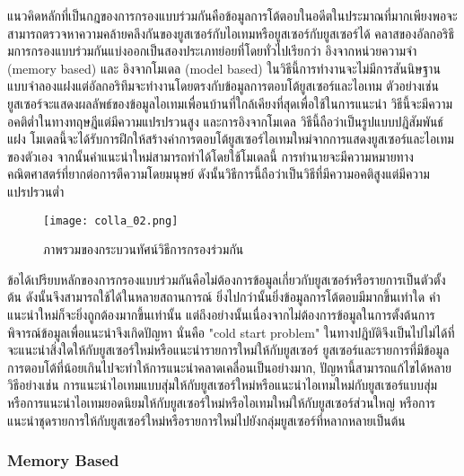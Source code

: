 แนวคิดหลักที่เป็นกฎของการกรองแบบร่วมกันคือข้อมูลการโต้ตอบในอดีตในประมาณที่มากเพียงพอจะสามารถตรวจหาความคล้ายคลึงกันของยูสเซอร์กับไอเทมหรือยูสเซอร์กับยูสเซอร์ได้ 
คลาสของอัลกอริธึมการกรองแบบร่วมกันแบ่งออกเป็นสองประเภทย่อยที่โดยทั่วไปเรียกว่า อิงจากหน่วยความจำ (memory based) และ อิงจากโมเดล (model based) ในวิธีนี้การทำงานจะไม่มีการสันนิษฐานแบบจำลองแฝงแต่อัลกอริทึมจะทำงานโดยตรงกับข้อมูลการตอบโต้ยูสเซอร์และไอเทม ตัวอย่างเช่น ยูสเซอร์จะแสดงผลลัพธ์ของข้อมูลไอเทมเพื่อนบ้านที่ใกล้เคียงที่สุดเพื่อใช้ในการแนะนำ วิธีนี้จะมีความอคติต่ำในทางทฤษฎีแต่มีความแปรปรวนสูง 
และการอิงจากโมเดล วิธีนี้ถือว่าเป็นรูปแบบปฎิสัมพันธ์แฝง โมเดลนี้จะได้รับการฝึกให้สร้างค่าการตอบโต้ยูสเซอร์ไอเทมใหม่จากการแสดงยูสเซอร์และไอเทมของตัวเอง จากนั้นคำแนะนำใหม่สามารถทำได้โดยใช้โมเดลนี้ การทำนายจะมีความหมายทางคณิตศาสตร์ที่ยากต่อการตีความโดยมนุษย์ ดังนั้นวิธีการนี้ถือว่าเป็นวิธีที่มีความอคติสูงแต่มีความแปรปรวนต่ำ
\newline
\begin{figure}[!h]
  \centering
  \texttt{[image: colla\_02.png]}  
  \caption{ภาพรวมของกระบวนทัศน์วิธีการกรองร่วมกัน}
  \label{Fig:cell-and-block}
\end{figure}
\pagebreak

ข้อได้เปรียบหลักของการกรองแบบร่วมกันคือไม่ต้องการข้อมูลเกี่ยวกับยูสเซอร์หรือรายการเป็นตัวตั้งต้น ดังนั้นจึงสามารถใช้ได้ในหลายสถานการณ์ ยิ่งไปกว่านั้นยิ่งข้อมูลการโต้ตอบมีมากขึ้นเท่าใด คำแนะนำใหม่ก็จะยิ่งถูกต้องมากขึ้นเท่านั้น
แต่ถึงอย่างนั้นเนื่องจากไม่ต้องการข้อมูลในการตั้งต้นการพิจารณ์ข้อมูลเพื่อแนะนำจึงเกิดปัญหา นั่นคือ "cold start problem" ในทางปฎิบัติจึงเป็นไปไม่ได้ที่จะแนะนำสิ่งใดให้กับยูสเซอร์ใหม่หรือแนะนำรายการใหม่ให้กับยูสเซอร์ ยูสเซอร์และรายการที่มีข้อมูลการตอบโต้ที่น้อยเกินไปจะทำให้การแนะนำคลาดเคลื่อนเป็นอย่างมาก, ปัญหานี้สามารถแก้ไขได้หลายวิธีอย่างเช่น การแนะนำไอเทมแบบสุ่มให้กับยูสเซอร์ใหม่หรือแนะนำไอเทมใหม่กับยูสเซอร์แบบสุ่ม หรือการแนะนำไอเทมยอดนิยมให้กับยูสเซอร์ใหม่หรือไอเทมใหม่ให้กับยูสเซอร์ส่วนใหญ่ หรือการแนะนำชุดรายการให้กับยูสเซอร์ใหม่หรือรายการใหม่ไปยังกลุ่มยูสเซอร์ที่หลากหลายเป็นต้น

\pagebreak
\subsubsection{Memory Based}
